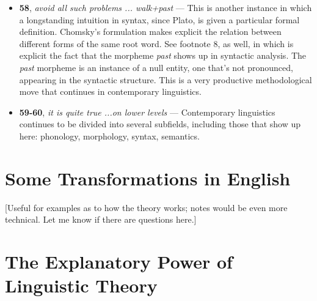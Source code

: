 \documentclass[12pt]{article}
\begin{document}
\begin{itemize}
\item \textbf{58}, \textit{avoid all such problems ... walk+past} --- This is another instance in which a longstanding intuition in syntax, since Plato, is given a particular formal definition. Chomsky's formulation makes explicit the relation between different forms of the same root word. See footnote 8, as well, in which is explicit the fact that the morpheme \textit{past} shows up in syntactic analysis. The \textit{past} morpheme is an instance of a null entity, one that's not pronounced, appearing in the syntactic structure. This is a very productive methodological move that continues in contemporary linguistics.

\item \textbf{59-60}, \textit{it is quite true ...on lower levels} --- Contemporary linguistics continues to be divided into several subfields, including those that show up here: phonology, morphology, syntax, semantics.

\end{itemize}

\section{Some Transformations in English}

[Useful for examples as to how the theory works; notes would be even more technical. Let me know if there are questions here.]

\section{The Explanatory Power of Linguistic Theory}
\end{document}
